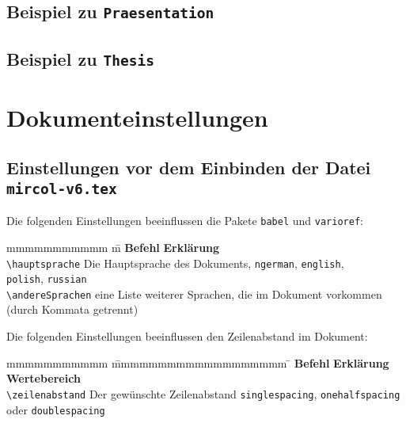 		\begin{center}
			\vspace*{20em}
			\subsection{Beispiel zu \texttt{Praesentation}}
		\end{center}
		\newpage


		\begin{center}
			\vspace*{20em}
			\subsection{Beispiel zu \texttt{Thesis}}
		\end{center}
		\label{thesis-bsp}
		\newpage



	\section{Dokumenteinstellungen}
		\subsection{Einstellungen vor dem Einbinden der Datei \texttt{mircol-v6.tex}}
			Die folgenden Einstellungen beeinflussen die Pakete \texttt{babel} und \texttt{varioref}:
			\begin{tabbing}
				mmmmmmmmmmm 			\= m \kill
				\textbf{Befehl}			\> \textbf{Erklärung} \\
				\verb|\hauptsprache|	\> Die Hauptsprache des Dokuments, \zb \verb|ngerman|, \verb|english|, \\
										\> \verb|polish|, \verb|russian|  \\
				\verb|\andereSprachen|	\> eine Liste weiterer Sprachen, die im Dokument vorkommen \\
										\> (durch Kommata getrennt)
			\end{tabbing}
			Die folgenden Einstellungen beeinflussen den Zeilenabstand im Dokument:
			\begin{tabbing}
				mmmmmmmmmmm 			\= mmmmmmmmmmmmmmmmmmm \= \kill
				\textbf{Befehl}			\> \textbf{Erklärung}			\> \textbf{Wertebereich} \\
				\verb|\zeilenabstand|	\> Der gewünschte Zeilenabstand \> \texttt{singlespacing}, \texttt{onehalfspacing} \\
										\>								\> oder \texttt{doublespacing}
			\end{tabbing}

